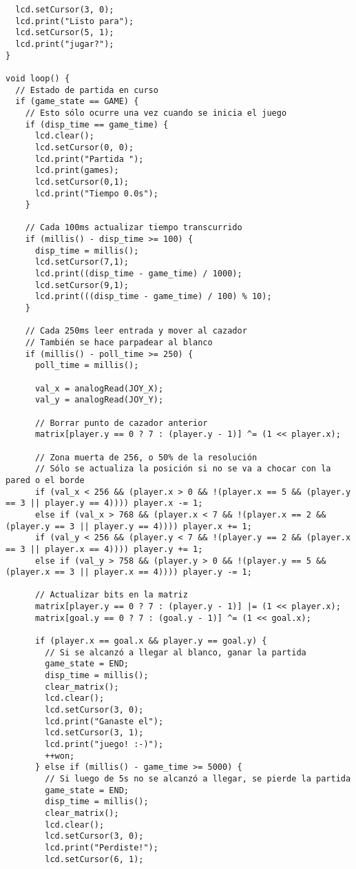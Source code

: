 \begin{listing}[H]
     \scriptsize
  \begin{verbatim}
  lcd.setCursor(3, 0);
  lcd.print("Listo para");
  lcd.setCursor(5, 1);
  lcd.print("jugar?");
}

void loop() {
  // Estado de partida en curso
  if (game_state == GAME) {
    // Esto sólo ocurre una vez cuando se inicia el juego
    if (disp_time == game_time) {
      lcd.clear();
      lcd.setCursor(0, 0);
      lcd.print("Partida ");
      lcd.print(games);
      lcd.setCursor(0,1);
      lcd.print("Tiempo 0.0s");
    } 
    
    // Cada 100ms actualizar tiempo transcurrido
    if (millis() - disp_time >= 100) {
      disp_time = millis();
      lcd.setCursor(7,1);
      lcd.print((disp_time - game_time) / 1000);
      lcd.setCursor(9,1);
      lcd.print(((disp_time - game_time) / 100) % 10);
    }

    // Cada 250ms leer entrada y mover al cazador
    // También se hace parpadear al blanco
    if (millis() - poll_time >= 250) {
      poll_time = millis();

      val_x = analogRead(JOY_X);
      val_y = analogRead(JOY_Y);

      // Borrar punto de cazador anterior
      matrix[player.y == 0 ? 7 : (player.y - 1)] ^= (1 << player.x);

      // Zona muerta de 256, o 50% de la resolución
      // Sólo se actualiza la posición si no se va a chocar con la pared o el borde
      if (val_x < 256 && (player.x > 0 && !(player.x == 5 && (player.y == 3 || player.y == 4)))) player.x -= 1;
      else if (val_x > 768 && (player.x < 7 && !(player.x == 2 && (player.y == 3 || player.y == 4)))) player.x += 1;
      if (val_y < 256 && (player.y < 7 && !(player.y == 2 && (player.x == 3 || player.x == 4)))) player.y += 1;
      else if (val_y > 758 && (player.y > 0 && !(player.y == 5 && (player.x == 3 || player.x == 4)))) player.y -= 1;

      // Actualizar bits en la matriz
      matrix[player.y == 0 ? 7 : (player.y - 1)] |= (1 << player.x);
      matrix[goal.y == 0 ? 7 : (goal.y - 1)] ^= (1 << goal.x);

      if (player.x == goal.x && player.y == goal.y) {
        // Si se alcanzó a llegar al blanco, ganar la partida
        game_state = END;
        disp_time = millis();
        clear_matrix();
        lcd.clear();
        lcd.setCursor(3, 0);
        lcd.print("Ganaste el");
        lcd.setCursor(3, 1);
        lcd.print("juego! :-)");
        ++won;
      } else if (millis() - game_time >= 5000) {
        // Si luego de 5s no se alcanzó a llegar, se pierde la partida
        game_state = END;
        disp_time = millis();
        clear_matrix();
        lcd.clear();
        lcd.setCursor(3, 0);
        lcd.print("Perdiste!");
        lcd.setCursor(6, 1);
\end{verbatim}
\end{listing}
